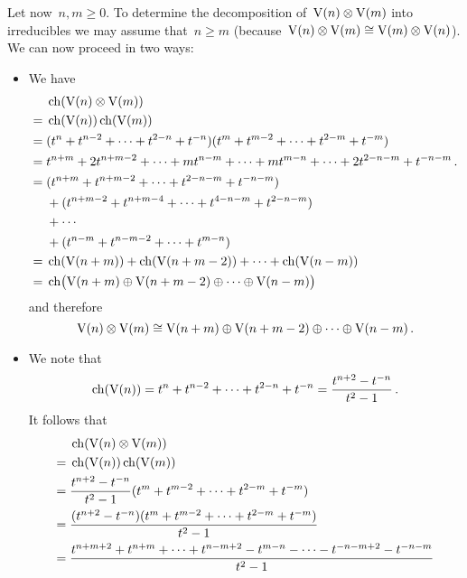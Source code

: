 Let now~$n, m \geq 0$.
To determine the decomposition of~$\operatorname{V}(n) \otimes \operatorname{V}(m)$ into irreducibles we may assume that~$n \geq m$ (because~$\operatorname{V}(n) \otimes \operatorname{V}(m) \cong \operatorname{V}(m) \otimes \operatorname{V}(n)$).
We can now proceed in two ways:
\begin{itemize}
  \item
    We have
    \begin{align*}
      {}&
      \operatorname{ch}(\operatorname{V}(n) \otimes \operatorname{V}(m))
      \\
      ={}&
      \operatorname{ch}(\operatorname{V}(n)) \operatorname{ch}(\operatorname{V}(m))
      \\
      ={}&
      (t^n + t^{n-2} + \dotsb + t^{2-n} + t^{-n})
      (t^m + t^{m-2} + \dotsb + t^{2-m} + t^{-m})
      \\
      ={}&
          t^{n+m}
      + 2 t^{n+m-2}
      + \dotsb
      + m t^{n-m}
      + \dotsb
      + m t^{m-n}
      + \dotsb
      + 2 t^{2-n-m}
      + t^{-n-m} \,.
      \\
      ={}&
      (t^{n+m} + t^{n+m-2} + \dotsb + t^{2-n-m} + t^{-n-m})
      \\
      {}&
      + (t^{n+m-2} + t^{n+m-4} + \dotsb + t^{4-n-m} + t^{2-n-m})
      \\
      {}&
      + \dotsb
      \\
      {}&
      + (t^{n-m} + t^{n-m-2} + \dotsb + t^{m-n})
      \\
      ={}&
      \operatorname{ch}(\operatorname{V}(n+m)) + \operatorname{ch}(\operatorname{V}(n+m-2)) + \dotsb + \operatorname{ch}(\operatorname{V}(n-m))
      \\
      ={}&
      \operatorname{ch}\bigl( \operatorname{V}(n+m) \oplus \operatorname{V}(n+m-2) \oplus \dotsb \oplus \operatorname{V}(n-m) \bigr)
    \end{align*}
    and therefore
    \[
      \operatorname{V}(n) \otimes \operatorname{V}(m)
      \cong
      \operatorname{V}(n+m) \oplus \operatorname{V}(n+m-2) \oplus \dotsb \oplus \operatorname{V}(n-m) \,.
    \]
  \item
    We note that
    \[
      \operatorname{ch}(\operatorname{V}(n))
      =
      t^n + t^{n-2} + \dotsb + t^{2-n} + t^{-n}
      =
      \frac{t^{n+2} - t^{-n}}{t^2 - 1} \,.
    \]
    It follows that
    \begin{align*}
      {}&
      \ch(\irr(n) \tensor \irr(m))
      \\
      ={}&
      \ch(\irr(n)) \ch(\irr(m))
      \\
      ={}&
      \frac{t^{n+2} - t^{-n}}{t^2 - 1} (t^m + t^{m-2} + \dotsb + t^{2-m} + t^{-m})
      \\
      ={}&
      \frac{(t^{n+2} - t^{-n})(t^m + t^{m-2} + \dotsb + t^{2-m} + t^{-m})}{t^2 - 1}
      \\
      ={}&
      \frac{ t^{n+m+2} + t^{n+m} + \dotsb + t^{n-m+2} - t^{m-n} - \dotsb - t^{-n-m+2} - t^{-n-m} }{t^2 - 1}

\end{align*}
\end{itemize}
